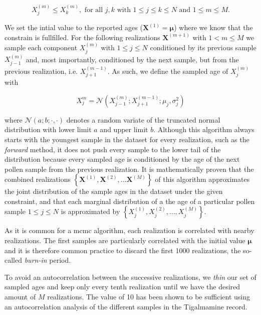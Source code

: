 \begin{refsection}
\begin{equation}
	X^{(m)}_j \leq X^{(m)}_k, \text{ for all } j, k \text{ with } 1 \leq j \leq k \leq N \text{ and } 1\leq m \leq M.
\end{equation}

We set the intial value to the reported ages ($\mathbf{X}^{(1)} = \boldsymbol{\mu}$) where we know that the constrain is fullfilled. For the following realizations $\mathbf{X}^{(m+1)}$ with $1 < m \leq M$ we sample each component $X_j^{(m)}$ with $1 \leq j \leq N$ conditioned by its previous sample $X_{j-1}^{(m)}$ and, most importantly, conditioned by the next sample, but from the previous realization, i.e. $X_{j+1}^{(m-1)}$. As such, we define the sampled age of $X_j^{(m)}$ with

\begin{equation}
	X^{m}_j = \mathcal{N}(X_{j-1}^{(m)}; X_{j+1}^{(m-1)}; \mu_j, \sigma_j^2)
\end{equation}

where $\mathcal{N}(a; b; \cdot, \cdot)$ denotes a random variate of the truncated normal distribution with lower limit $a$ and upper limit $b$. Although this algorithm always starts with the youngest sample in the dataset for every realization, such as the \textit{forward} method, it does not push every sample to the lower tail of the distribution because every sampled age is conditioned by the age of the next pollen sample from the previous realization. It is mathematically proven that the combined realizations $\left\lbrace\mathbf{X}^{(1)}, \mathbf{X}^{(2)}, \ldots \mathbf{X}^{(M)}\right\rbrace$ of this algorithm approximates the joint distribution of the sample ages in the dataset under the given constraint, and that each marginal distribution of a the age of a particular pollen sample $1 \leq j \leq N$ is approximated by $\left\lbrace X_j^{(1)}, X_j^{(2)}, \ldots, X_j^{(M)} \right\rbrace$.

As it is common for a \gls{mcmc} algorithm, each realization is correlated with nearby realizations. The first samples are particularly correlated with the initial value $\boldsymbol{\mu}$ and it is therefore common practice to discard the first 1000 realizations, the so-called \textit{burn-in} period. 

To avoid an autocorrelation between the successive realizations, we \textit{thin} our set of sampled ages and keep only every tenth realization until we have the desired amount of $M$ realizations. The value of 10 has been shown to be sufficient using an autocorrelation analysis of the different samples in the Tigalmamine record.


\end{refsection}
